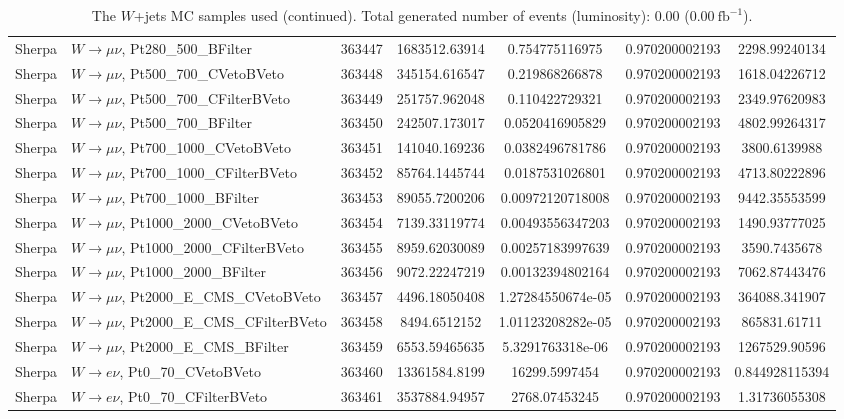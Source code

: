 \begin{table}[h]
\begin{center}
\begin{tabular}{|l|l|c|
S[table-parse-only, round-precision=4]|
S[table-parse-only, round-precision=3]|
S[table-parse-only, round-precision=3]|
S[table-parse-only, round-precision=3]|
}
Sherpa & $W\rightarrow\mu\nu$, Pt280\_500\_BFilter & 363447 & 1683512.63914 & 0.754775116975 & 0.970200002193 & 2298.99240134 \\
Sherpa & $W\rightarrow\mu\nu$, Pt500\_700\_CVetoBVeto & 363448 & 345154.616547 & 0.219868266878 & 0.970200002193 & 1618.04226712 \\
Sherpa & $W\rightarrow\mu\nu$, Pt500\_700\_CFilterBVeto & 363449 & 251757.962048 & 0.110422729321 & 0.970200002193 & 2349.97620983 \\
Sherpa & $W\rightarrow\mu\nu$, Pt500\_700\_BFilter & 363450 & 242507.173017 & 0.0520416905829 & 0.970200002193 & 4802.99264317 \\
Sherpa & $W\rightarrow\mu\nu$, Pt700\_1000\_CVetoBVeto & 363451 & 141040.169236 & 0.0382496781786 & 0.970200002193 & 3800.6139988 \\
Sherpa & $W\rightarrow\mu\nu$, Pt700\_1000\_CFilterBVeto & 363452 & 85764.1445744 & 0.0187531026801 & 0.970200002193 & 4713.80222896 \\
Sherpa & $W\rightarrow\mu\nu$, Pt700\_1000\_BFilter & 363453 & 89055.7200206 & 0.00972120718008 & 0.970200002193 & 9442.35553599 \\
Sherpa & $W\rightarrow\mu\nu$, Pt1000\_2000\_CVetoBVeto & 363454 & 7139.33119774 & 0.00493556347203 & 0.970200002193 & 1490.93777025 \\
Sherpa & $W\rightarrow\mu\nu$, Pt1000\_2000\_CFilterBVeto & 363455 & 8959.62030089 & 0.00257183997639 & 0.970200002193 & 3590.7435678 \\
Sherpa & $W\rightarrow\mu\nu$, Pt1000\_2000\_BFilter & 363456 & 9072.22247219 & 0.00132394802164 & 0.970200002193 & 7062.87443476 \\
Sherpa & $W\rightarrow\mu\nu$, Pt2000\_E\_CMS\_CVetoBVeto & 363457 & 4496.18050408 & 1.27284550674e-05 & 0.970200002193 & 364088.341907 \\
Sherpa & $W\rightarrow\mu\nu$, Pt2000\_E\_CMS\_CFilterBVeto & 363458 & 8494.6512152 & 1.01123208282e-05 & 0.970200002193 & 865831.61711 \\
Sherpa & $W\rightarrow\mu\nu$, Pt2000\_E\_CMS\_BFilter & 363459 & 6553.59465635 & 5.3291763318e-06 & 0.970200002193 & 1267529.90596 \\
Sherpa & $W\rightarrow e\nu$, Pt0\_70\_CVetoBVeto & 363460 & 13361584.8199 & 16299.5997454 & 0.970200002193 & 0.844928115394 \\
Sherpa & $W\rightarrow e\nu$, Pt0\_70\_CFilterBVeto & 363461 & 3537884.94957 & 2768.07453245 & 0.970200002193 & 1.31736055308 \\
\bottomrule
\end{tabular}
\caption{The $W$+jets MC samples used (continued). Total generated number of events (luminosity): 0.00 (0.00$~\mathrm{fb}^{-1}$).}
\label{tab:app:datamcW_sherpa_220}
\end{center}
\end{table}
